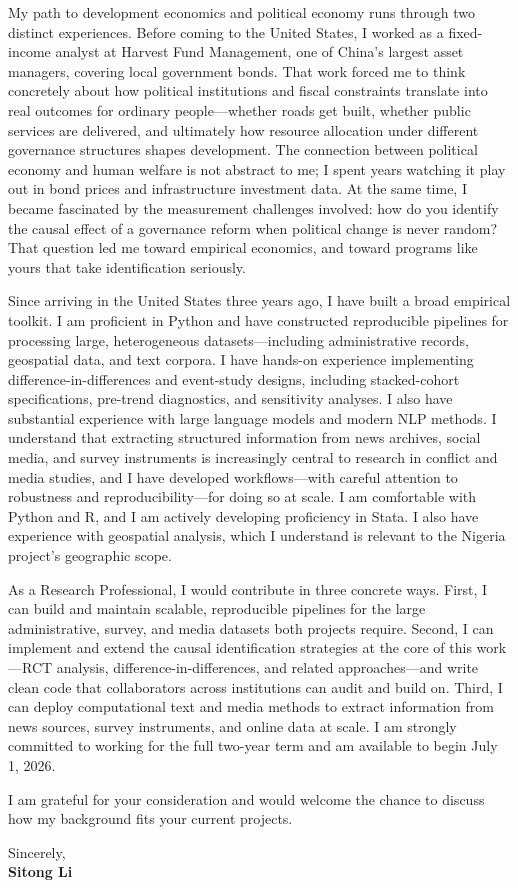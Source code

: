 \documentclass[12pt]{article}
\begin{document}
My path to development economics and political economy runs through two distinct
experiences. Before coming to the United States, I worked as a fixed-income analyst
at Harvest Fund Management, one of China's largest asset managers, covering local
government bonds. That work forced me to think concretely about how political
institutions and fiscal constraints translate into real outcomes for ordinary
people---whether roads get built, whether public services are delivered, and
ultimately how resource allocation under different governance structures shapes
development. The connection between political economy and human welfare is not
abstract to me; I spent years watching it play out in bond prices and infrastructure
investment data. At the same time, I became fascinated by the measurement
challenges involved: how do you identify the causal effect of a governance reform
when political change is never random? That question led me toward empirical
economics, and toward programs like yours that take identification seriously.

Since arriving in the United States three years ago, I have built a broad empirical
toolkit. I am proficient in Python and have constructed reproducible pipelines for
processing large, heterogeneous datasets---including administrative records,
geospatial data, and text corpora. I have hands-on experience implementing
difference-in-differences and event-study designs, including stacked-cohort
specifications, pre-trend diagnostics, and sensitivity analyses. I also have
substantial experience with large language models and modern NLP methods. I
understand that extracting structured information from news archives, social media,
and survey instruments is increasingly central to research in conflict and media
studies, and I have developed workflows---with careful attention to robustness and
reproducibility---for doing so at scale. I am comfortable with Python and R, and I
am actively developing proficiency in Stata. I also have experience with geospatial
analysis, which I understand is relevant to the Nigeria project's geographic scope.

As a Research Professional, I would contribute in three concrete ways. First, I can
build and maintain scalable, reproducible pipelines for the large administrative,
survey, and media datasets both projects require. Second, I can implement and extend
the causal identification strategies at the core of this work---RCT analysis,
difference-in-differences, and related approaches---and write clean code that
collaborators across institutions can audit and build on. Third, I can deploy
computational text and media methods to extract information from news sources,
survey instruments, and online data at scale. I am strongly committed to working for
the full two-year term and am available to begin July 1, 2026.

I am grateful for your consideration and would welcome the chance to discuss how my
background fits your current projects.

\vspace{1em}

\noindent Sincerely,\\[0.5em]
\textbf{Sitong Li}
\end{document}
